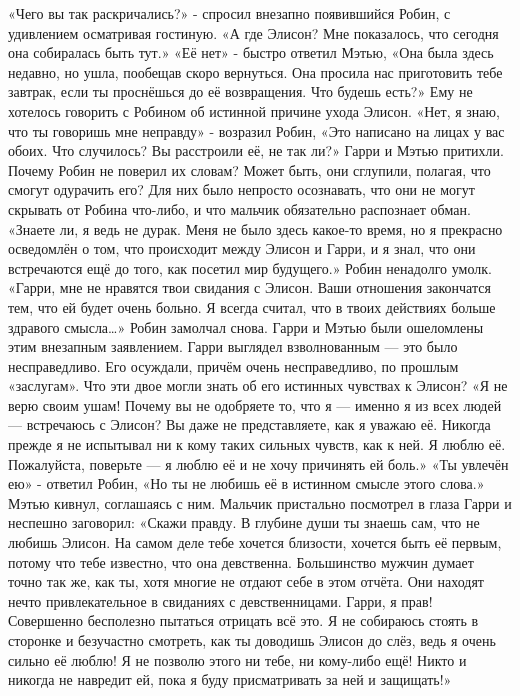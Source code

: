 \documentclass[a4paper,12pt]{book}
\begin{document}
	«Чего вы так раскричались?» - спросил внезапно появившийся Робин, с удивлением осматривая гостиную.
	«А где Элисон? Мне показалось, что сегодня она собиралась быть тут.»
	«Её нет» - быстро ответил Мэтью,
	«Она была здесь недавно, но ушла, пообещав скоро вернуться. Она просила нас приготовить тебе завтрак, если ты проснёшься до её возвращения. Что будешь есть?»
	Ему не хотелось говорить с Робином об истинной причине ухода Элисон.
	«Нет, я знаю, что ты говоришь мне неправду» - возразил Робин,
	«Это написано на лицах у вас обоих. Что случилось? Вы расстроили её, не так ли?»
	Гарри и Мэтью притихли. Почему Робин не поверил их словам? Может быть, они сглупили, полагая, что смогут одурачить его? Для них было непросто осознавать, что они не могут скрывать от Робина что-либо, и что мальчик обязательно распознает обман.
	«Знаете ли, я ведь не дурак. Меня не было здесь какое-то время, но я прекрасно осведомлён о том, что происходит между Элисон и Гарри, и я знал, что они встречаются ещё до того, как посетил мир будущего.»
	Робин ненадолго умолк.
	«Гарри, мне не нравятся твои свидания с Элисон. Ваши отношения закончатся тем, что ей будет очень больно. Я всегда считал, что в твоих действиях больше здравого смысла…»
	Робин замолчал снова. Гарри и Мэтью были ошеломлены этим внезапным заявлением. Гарри выглядел взволнованным — это было несправедливо. Его осуждали, причём очень несправедливо, по прошлым «заслугам». Что эти двое могли знать об его истинных чувствах к Элисон?
	«Я не верю своим ушам! Почему вы не одобряете то, что я — именно я из всех людей — встречаюсь с Элисон? Вы даже не представляете, как я уважаю её. Никогда прежде я не испытывал ни к кому таких сильных чувств, как к ней. Я люблю её. Пожалуйста, поверьте — я люблю её и не хочу причинять ей боль.»
	«Ты увлечён ею» - ответил Робин,
	«Но ты не любишь её в истинном смысле этого слова.»
	Мэтью кивнул, соглашаясь с ним. Мальчик пристально посмотрел в глаза Гарри и неспешно заговорил:
	«Скажи правду. В глубине души ты знаешь сам, что не любишь Элисон. На самом деле тебе хочется близости, хочется быть её первым, потому что тебе известно, что она девственна. Большинство мужчин думает точно так же, как ты, хотя многие не отдают себе в этом отчёта. Они находят нечто привлекательное в свиданиях с девственницами. Гарри, я прав! Совершенно бесполезно пытаться отрицать всё это. Я не собираюсь стоять в сторонке и безучастно смотреть, как ты доводишь Элисон до слёз, ведь я очень сильно её люблю! Я не позволю этого ни тебе, ни кому-либо ещё! Никто и никогда не навредит ей, пока я буду присматривать за ней и защищать!»
\end{document}
